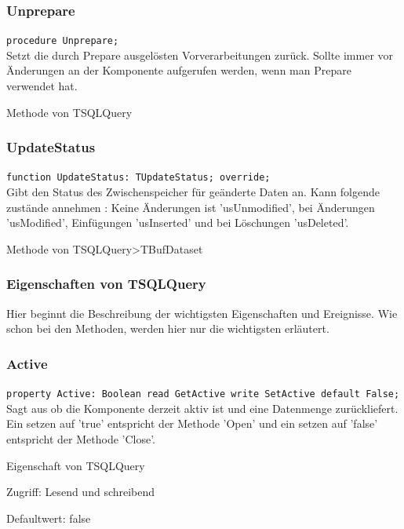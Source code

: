 \subsubsection{Unprepare}
\begin{description}
  \item \texttt{procedure Unprepare;}\\
Setzt die durch Prepare ausgelösten Vorverarbeitungen zurück. Sollte immer vor Änderungen an der Komponente aufgerufen werden, wenn man Prepare verwendet hat.
  \begin{description}
    \item Methode von TSQLQuery
  \end{description}
\end{description}

\subsubsection{UpdateStatus}
\begin{description}
  \item \texttt{function UpdateStatus: TUpdateStatus; override;}\\
Gibt den Status des Zwischenspeicher für geänderte Daten an. Kann folgende zustände annehmen : Keine Änderungen ist 'usUnmodified', bei Änderungen 'usModified', Einfügungen 'usInserted' und bei Löschungen 'usDeleted'.
  \begin{description}
    \item Methode von TSQLQuery>TBufDataset
  \end{description}
\end{description}

\subsubsection{Eigenschaften von TSQLQuery}
Hier beginnt die Beschreibung der wichtigsten Eigenschaften und Ereignisse. Wie schon bei den Methoden, werden hier nur die wichtigsten erläutert. 

\subsubsection{Active}
\begin{description}
  \item \texttt{property Active: Boolean read GetActive write SetActive default False;}\\ Sagt aus ob die Komponente derzeit aktiv ist und eine Datenmenge zurückliefert. Ein setzen auf 'true' entspricht der Methode 'Open' und ein setzen auf 'false' entspricht der Methode 'Close'.
  \begin{description}
    \item Eigenschaft von TSQLQuery
  \end{description}
  \begin{description}
    \item Zugriff: Lesend und schreibend
    \item Defaultwert: false
  \end{description}
\end{description}

